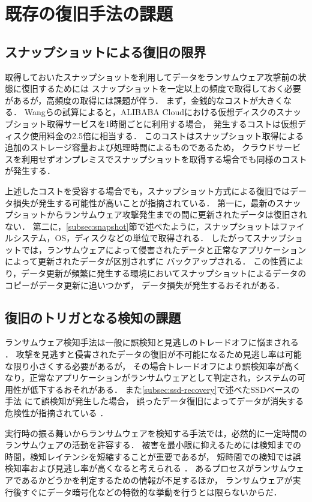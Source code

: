 \section{既存の復旧手法の課題}
\label{sec:recovery-challenges}
\subsection{スナップショットによる復旧の限界}
取得しておいたスナップショットを利用してデータをランサムウェア攻撃前の状態に復旧するためには
スナップショットを一定以上の頻度で取得しておく必要があるが，高頻度の取得には課題が伴う．
まず，金銭的なコストが大きくなる．
Wangら\cite{wang2024ransom}の試算によると，ALIBABA Cloudにおける仮想ディスクのスナップショット取得サービスを1時間ごとに利用する場合，
発生するコストは仮想ディスク使用料金の2.5倍に相当する．
このコストはスナップショット取得による追加のストレージ容量および処理時間によるものであるため，
クラウドサービスを利用せずオンプレミスでスナップショットを取得する場合でも同様のコストが発生する．

上述したコストを受容する場合でも，スナップショット方式による復旧ではデータ損失が発生する可能性が高いことが指摘されている\cite{wang2024ransom}．
第一に，最新のスナップショットからランサムウェア攻撃発生までの間に更新されたデータは復旧されない．
第二に，\ref{subsec:snapshot}節で述べたように，スナップショットはファイルシステム，OS，ディスクなどの単位で取得される．
したがってスナップショットでは，ランサムウェアによって侵害されたデータと正常なアプリケーションによって更新されたデータが区別されずに
バックアップされる．
この性質により，データ更新が頻繁に発生する環境においてスナップショットによるデータのコピーがデータ更新に追いつかず，
データ損失が発生するおそれがある．

\subsection{復旧のトリガとなる検知の課題}
ランサムウェア検知手法は一般に誤検知と見逃しのトレードオフに悩まされる \cite{Evolution-Ransomware,berrueta2019survey, mitigation-modern}．
攻撃を見逃すと侵害されたデータの復旧が不可能になるため見逃し率は可能な限り小さくする必要があるが，
その場合トレードオフにより誤検知率が高くなり，正常なアプリケーションがランサムウェアとして判定され，システムの可用性が低下するおそれがある．
また\ref{subsec:ssd-recovery}で述べたSSDベースの手法 \cite{huang2017flashguard,baek2018ssd} にて誤検知が発生した場合，
誤ったデータ復旧によってデータが消失する危険性が指摘されている \cite{css2024-enomoto}．

実行時の振る舞いからランサムウェアを検知する手法では，必然的に一定時間のランサムウェアの活動を許容する．
被害を最小限に抑えるためには検知までの時間，検知レイテンシを短縮することが重要であるが，
短時間での検知では誤検知率および見逃し率が高くなると考えられる \cite{mitigation-modern}．
あるプロセスがランサムウェアであるかどうかを判定するための情報が不足するほか，
ランサムウェアが実行後すぐにデータ暗号化などの特徴的な挙動を行うとは限らないからだ．
